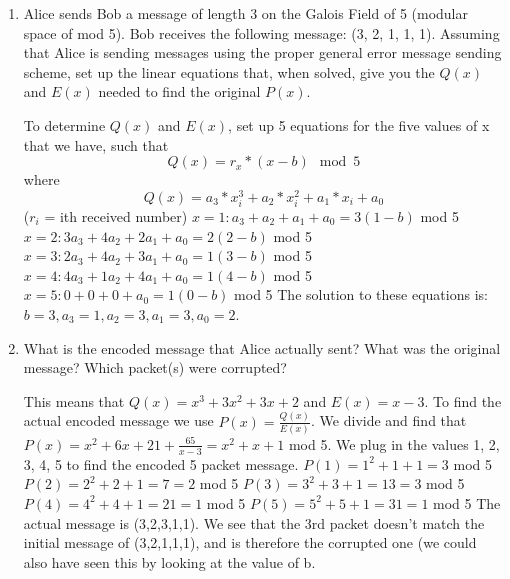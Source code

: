 \question \begin{enumerate}[label=(\alph*)]
\item Alice sends Bob a message of length 3 on the Galois Field of 
5 (modular space of mod 5). Bob receives the following message: 
(3, 2, 1, 1, 1). Assuming that Alice is sending messages using the 
proper general error message sending scheme, set up the linear equations 
that, when solved, give you the $Q(x)$ and $E(x)$ needed to find the 
original $P(x)$.
\begin{solution}[2in]
To determine $Q(x)$ and $E(x)$, set up 5 equations for the five values of x that we have, such that 
\[Q(x) = r_{x}*(x-b) \mod 5\] 
where 
\[Q(x)= a_3*x_i^3 + a_2*x_i^2 + a_1*x_i + a_0\]
($r_i$ = ith received number)\newline
$ x=1: a_3 + a_2 + a_1 + a_0 = 3(1 - b) $ mod 5 \newline
$ x=2: 3a_3 + 4a_2 + 2a_1 + a_0 = 2(2 - b) $ mod 5 \newline
$ x=3: 2a_3 + 4a_2 + 3a_1 + a_0 =  1(3 - b) $ mod 5 \newline
$ x=4: 4a_3 + 1a_2 + 4a_1 + a_0 =  1(4 - b) $ mod 5 \newline
$ x=5: 0 + 0 + 0 + a_0 = 1(0 - b) $ mod 5 \newline 
\newline
The solution to these equations is: 
$ b = 3, a_3 = 1, a_2 = 3, a_1 = 3, a_0 = 2 $. \newline
\end{solution}
\item What is the encoded message that Alice actually sent? What was the original
message? Which packet(s) were corrupted?
\begin{solution}[1 in]
This means that $Q(x) = x^3 + 3x^2 + 3x + 2$ and $E(x) = x-3$. \newline
To find the actual encoded message we use
$P(x) = \frac{Q(x)}{E(x)}$. We divide and find that $P(x) = x^2 + 6x + 21 + \frac{65}{x-3} = x^2 + x + 1$ mod 5.
We plug in the values 1, 2, 3, 4, 5 to find the encoded 5 packet message. \newline 
$ P(1) = 1^2 + 1 + 1 = 3$ mod 5 \newline
$ P(2) = 2^2 + 2 + 1 = 7 = 2$ mod 5 \newline
$ P(3) = 3^2 + 3 + 1 = 13 = 3$ mod 5 \newline
$ P(4) = 4^2 + 4 + 1 = 21 = 1$ mod 5 \newline
$ P(5) = 5^2 + 5 + 1 = 31 = 1$ mod 5 \newline 
The actual message is (3,2,3,1,1). We see that the 3rd packet doesn't match the initial message of (3,2,1,1,1), and is therefore the corrupted one (we could also have seen this by looking at the value of b. 
\end{solution}
\end{enumerate}